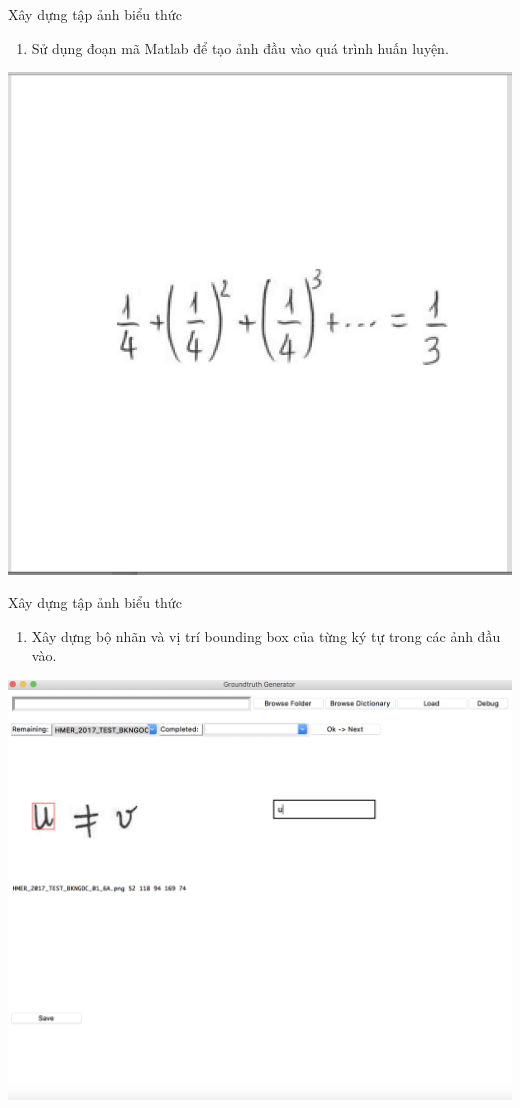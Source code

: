 \documentclass{beamer}
\newcounter{saveenumi}
\newcommand{\seti}{\setcounter{saveenumi}{\value{enumi}}}
\newcommand{\conti}{\setcounter{enumi}{\value{saveenumi}}}
\begin{document}
	\begin{frame}{Xây dựng tập ảnh biểu thức}
		\begin{enumerate}
			\conti
			\item Sử dụng đoạn mã Matlab để tạo ảnh đầu vào quá trình huấn luyện.
			\seti
		\end{enumerate}
		\begin{center}
			\centering
			\includegraphics[width=0.45\linewidth]{EXP_2017_072_2A.png}
			\vspace{0.5cm}
		\end{center}
	\end{frame}
	
	\begin{frame}{Xây dựng tập ảnh biểu thức}
		\begin{enumerate}
			\conti
			\item Xây dựng bộ nhãn và vị trí bounding box của từng ký tự trong các ảnh đầu vào.
		\end{enumerate}
		\begin{center}
			\centering
			\includegraphics[width=0.5\linewidth]{tool}
			\vspace{0.5cm}
		\end{center}
	\end{frame}
	
\end{document}
